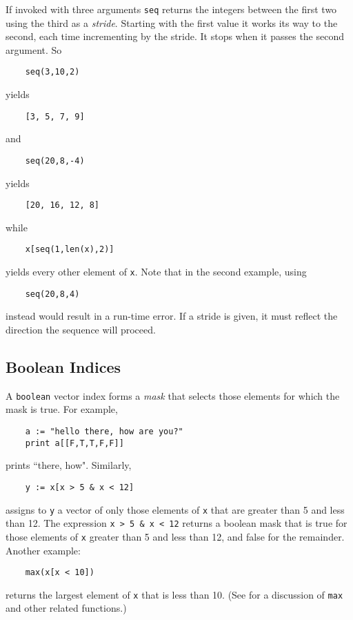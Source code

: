 If
invoked with three arguments {\tt seq} returns the integers between
the first two using the third as a {\em stride}.  Starting  with the first
value it works its way to the second, each time incrementing by the
stride.  It stops when it passes the second argument.  So
\begin{verbatim}
    seq(3,10,2)
\end{verbatim}
yields
\begin{verbatim}
    [3, 5, 7, 9]
\end{verbatim}
and
\begin{verbatim}
    seq(20,8,-4)
\end{verbatim}
yields
\begin{verbatim}
    [20, 16, 12, 8]
\end{verbatim}
while
\begin{verbatim}
    x[seq(1,len(x),2)]
\end{verbatim}
yields every other element of {\tt x}.
Note that in the second example, using
\begin{verbatim}
    seq(20,8,4)
\end{verbatim}
instead would result in a run-time error.  If a stride is given,
it must reflect the direction the sequence will proceed.

\subsection{Boolean Indices}
\label{boolean-indices}

A {\tt boolean} vector index forms a {\em mask}
that selects those elements for which the mask is true.  For example,
\begin{verbatim}
    a := "hello there, how are you?"
    print a[[F,T,T,F,F]]
\end{verbatim}
prints ``there, how".  Similarly,
\begin{verbatim}
    y := x[x > 5 & x < 12]
\end{verbatim}
assigns to {\tt y} a vector of only those elements of {\tt x}
that are greater
than 5 and less than 12. The expression {\tt x > 5 \& x < 12} returns
a boolean mask that is true for those elements of {\tt x} greater
than 5 and less than 12, and false for the remainder.  Another example:
\begin{verbatim}
    max(x[x < 10])
\end{verbatim}
returns the largest element of {\tt x} that is less than 10. (See
 for a discussion of {\tt max} and
other related functions.)


